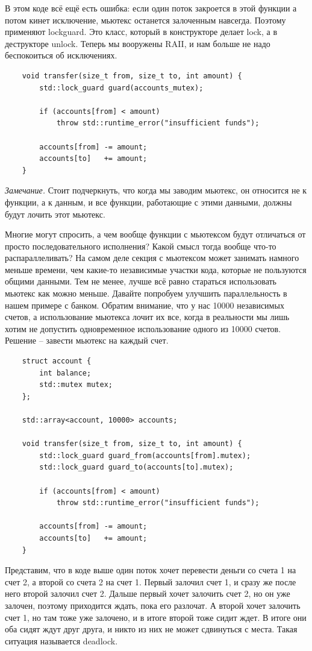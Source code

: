 \documentclass[12pt, a4paper]{article}
\begin{document}
В этом коде всё ещё есть ошибка: если один поток закроется в этой функции а потом кинет исключение, мьютекс останется залоченным навсегда. Поэтому применяют lock\textunderscore guard. Это класс, который в конструкторе делает lock, а в деструкторе unlock. Теперь мы вооружены RAII, и нам больше не надо беспокоиться об исключениях.
\begin{verbatim}
	void transfer(size_t from, size_t to, int amount) {
		std::lock_guard guard(accounts_mutex);
		
		if (accounts[from] < amount)
			throw std::runtime_error("insufficient funds");
		
		accounts[from] -= amount;
		accounts[to]   += amount;
	}
\end{verbatim}
\textit{Замечание.} Стоит подчеркнуть, что когда мы заводим мьютекс, он относится не к функции, а к данным, и все функции, работающие с этими данными, должны будут лочить этот мьютекс.
\par Многие могут спросить, а чем вообще функции с мьютексом будут отличаться от просто последовательного исполнения? Какой смысл тогда вообще что-то распараллеливать? На самом деле секция с мьютексом может занимать намного меньше времени, чем какие-то независимые участки кода, которые не пользуются общими данными. Тем не менее, лучше всё равно стараться использовать мьютекс как можно меньше. Давайте попробуем улучшить параллельность в нашем примере с банком. Обратим внимание, что у нас 10000 независимых счетов, а использование мьютекса лочит их все, когда в реальности мы лишь хотим не допустить одновременное использование одного из 10000 счетов. Решение -- завести мьютекс на каждый счет.
\begin{verbatim}
	struct account {
		int balance;
		std::mutex mutex;
	};
	
	std::array<account, 10000> accounts;
	
	void transfer(size_t from, size_t to, int amount) {
		std::lock_guard guard_from(accounts[from].mutex);
		std::lock_guard guard_to(accounts[to].mutex);
		
		if (accounts[from] < amount)
			throw std::runtime_error("insufficient funds");
		
		accounts[from] -= amount;
		accounts[to]   += amount;
	}
\end{verbatim}
Представим, что в коде выше один поток хочет перевести деньги со счета 1 на счет 2, а второй со счета 2 на счет 1. Первый залочил счет 1, и сразу же после него второй залочил счет 2. Дальше первый хочет залочить счет 2, но он уже залочен, поэтому приходится ждать, пока его разлочат. А второй хочет залочить счет 1, но там тоже уже залочено, и в итоге второй тоже сидит ждет. В итоге они оба сидят ждут друг друга, и никто из них не может сдвинуться с места. Такая ситуация называется deadlock.
\end{document}
